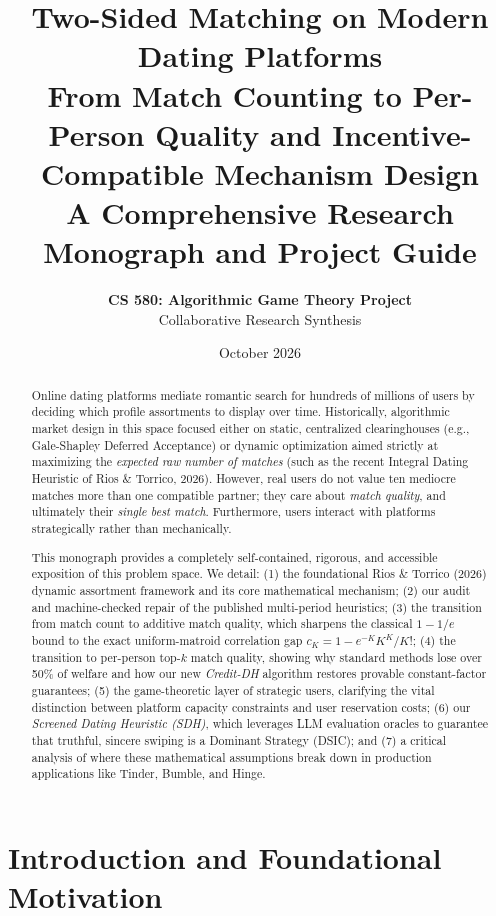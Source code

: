 \documentclass[11pt,letterpaper]{article}
\title{\textbf{\LARGE Two-Sided Matching on Modern Dating Platforms}\\[0.4em]
\Large From Match Counting to Per-Person Quality and Incentive-Compatible Mechanism Design\\[0.8em]
\large A Comprehensive Research Monograph and Project Guide}
\author{\textbf{CS 580: Algorithmic Game Theory Project}\\[0.2em]
Collaborative Research Synthesis}
\date{October 2026}
\theoremstyle{definition}
\theoremstyle{plain}
\theoremstyle{remark}
\begin{document}
\maketitle

\begin{abstract}
Online dating platforms mediate romantic search for hundreds of millions of users by deciding which profile assortments to display over time. Historically, algorithmic market design in this space focused either on static, centralized clearinghouses (e.g., Gale-Shapley Deferred Acceptance) or dynamic optimization aimed strictly at maximizing the \emph{expected raw number of matches} (such as the recent Integral Dating Heuristic of Rios \& Torrico, 2026). However, real users do not value ten mediocre matches more than one compatible partner; they care about \emph{match quality}, and ultimately their \emph{single best match}. Furthermore, users interact with platforms strategically rather than mechanically.

This monograph provides a completely self-contained, rigorous, and accessible exposition of this problem space. We detail: (1) the foundational Rios \& Torrico (2026) dynamic assortment framework and its core mathematical mechanism; (2) our audit and machine-checked repair of the published multi-period heuristics; (3) the transition from match count to additive match quality, which sharpens the classical $1-1/e$ bound to the exact uniform-matroid correlation gap $c_K = 1 - e^{-K}K^K/K!$; (4) the transition to per-person top-$k$ match quality, showing why standard methods lose over 50\% of welfare and how our new \emph{Credit-DH} algorithm restores provable constant-factor guarantees; (5) the game-theoretic layer of strategic users, clarifying the vital distinction between platform capacity constraints and user reservation costs; (6) our \emph{Screened Dating Heuristic (SDH)}, which leverages LLM evaluation oracles to guarantee that truthful, sincere swiping is a Dominant Strategy (DSIC); and (7) a critical analysis of where these mathematical assumptions break down in production applications like Tinder, Bumble, and Hinge.
\end{abstract}

\vspace{1em}
\tableofcontents
\newpage

\section{Introduction and Foundational Motivation}
\label{sec:intro}
\end{document}
